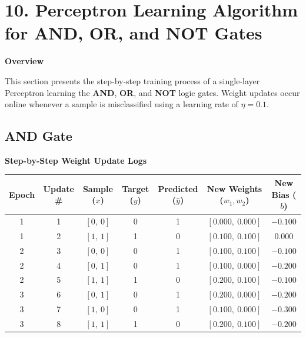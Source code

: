 \documentclass[11pt]{article}
\begin{document}

\section*{10. Perceptron Learning Algorithm for AND, OR, and NOT Gates}

\textbf{Overview}

This section presents the step-by-step training process of a single-layer Perceptron learning the \textbf{AND}, \textbf{OR}, and \textbf{NOT} logic gates. Weight updates occur online whenever a sample is misclassified using a learning rate of $\eta = 0.1$.

\vspace{3mm}

\subsection*{AND Gate}

\textbf{Step-by-Step Weight Update Logs}

\begin{center}
\begin{tabular}{|c|c|c|c|c|c|c|}
\hline
Epoch & Update \# & Sample ($x$) & Target ($y$) & Predicted ($\hat{y}$) & New Weights ($w_1, w_2$) & New Bias ($b$)\\
\hline
1 & 1 & $[0,\ 0]$ & 0 & 1 & $[0.000,\ 0.000]$ & $-0.100$\\
\hline
1 & 2 & $[1,\ 1]$ & 1 & 0 & $[0.100,\ 0.100]$ & $0.000$\\
\hline
2 & 3 & $[0,\ 0]$ & 0 & 1 & $[0.100,\ 0.100]$ & $-0.100$\\
\hline
2 & 4 & $[0,\ 1]$ & 0 & 1 & $[0.100,\ 0.000]$ & $-0.200$\\
\hline
2 & 5 & $[1,\ 1]$ & 1 & 0 & $[0.200,\ 0.100]$ & $-0.100$\\
\hline
3 & 6 & $[0,\ 1]$ & 0 & 1 & $[0.200,\ 0.000]$ & $-0.200$\\
\hline
3 & 7 & $[1,\ 0]$ & 0 & 1 & $[0.100,\ 0.000]$ & $-0.300$\\
\hline
3 & 8 & $[1,\ 1]$ & 1 & 0 & $[0.200,\ 0.100]$ & $-0.200$\\
\hline
\end{tabular}
\end{center}
\end{document}
